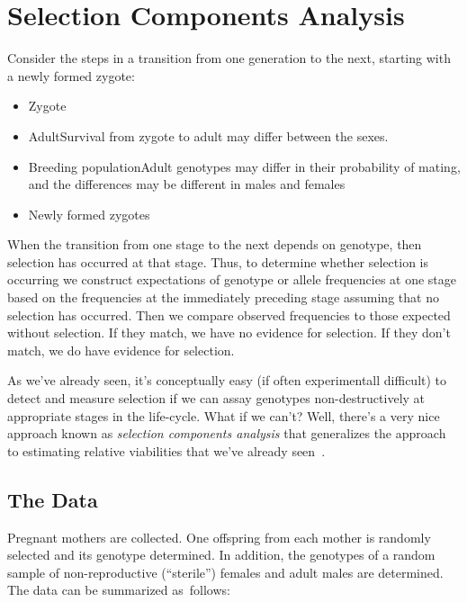 \chapter{Selection Components Analysis}

Consider the steps in a transition from one generation to the next,
starting with a newly formed zygote:

\begin{itemize}

\item Zygote

\item Adult{\dash}Survival from zygote to adult may differ between the
sexes.

\item Breeding population{\dash}Adult genotypes may differ in their
probability of mating, and the differences may be different in males
and females

\item Newly formed zygotes

\end{itemize}

\noindent When the transition from one stage to the next depends on
genotype, then selection has occurred at that stage. Thus, to
determine whether selection is occurring we construct expectations of
genotype or allele frequencies at one stage based on the frequencies
at the immediately preceding stage assuming that no selection has
occurred. Then we compare observed frequencies to those expected
without selection. If they match, we have no evidence for
selection. If they don't match, we do have evidence for selection. 

As we've already seen, it's conceptually easy (if often experimentall
difficult) to detect and measure selection if we can assay genotypes
non-destructively at appropriate stages in the life-cycle. What if we
can't? Well, there's a very nice approach known as {\it selection
  components analysis\/} that generalizes the approach to estimating
relative viabilities that we've already
seen~\cite{Christiansen-Frydenberg-1973}.

\section*{The Data}

Pregnant mothers are collected.  One offspring from each mother is
randomly selected and its genotype determined.  In addition, the
genotypes of a random sample of non-reproductive (``sterile'') females
and adult males are determined. The data can be summarized as~follows:

